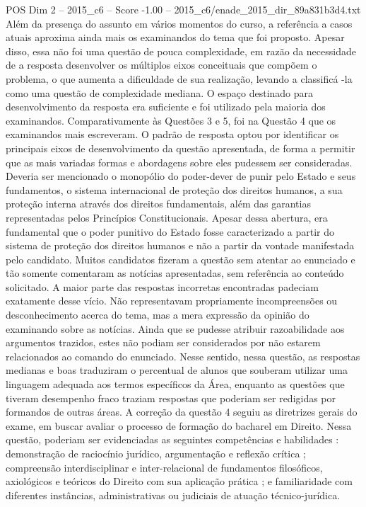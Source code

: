 \begin{textsample}{POS Dim 2 – 2015\_c6 – Score -1.00 – 2015\_c6/enade\_2015\_dir\_89a831b3d4.txt}
Além da presença do assunto em vários momentos do curso, a referência a casos atuais aproxima ainda mais os examinandos do tema que foi proposto.
Apesar disso, essa não foi uma questão de pouca complexidade, em razão da necessidade de a resposta desenvolver os múltiplos eixos conceituais que compõem o problema, o que aumenta a dificuldade de sua realização, levando a classificá -la como uma questão de complexidade mediana.
O espaço destinado para desenvolvimento da resposta era suficiente e foi utilizado pela maioria dos examinandos.
Comparativamente às Questões 3 e 5, foi na Questão 4 que os examinandos mais escreveram.
O padrão de resposta optou por identificar os principais eixos de desenvolvimento da questão apresentada, de forma a permitir que as mais variadas formas e abordagens sobre eles pudessem ser consideradas.
Deveria ser mencionado o monopólio do poder-dever de punir pelo Estado e seus fundamentos, o sistema internacional de proteção dos direitos humanos, a sua proteção interna através dos direitos fundamentais, além das garantias representadas pelos Princípios Constitucionais.
Apesar dessa abertura, era fundamental que o poder punitivo do Estado fosse caracterizado a partir do sistema de proteção dos direitos humanos e não a partir da vontade manifestada pelo candidato.
Muitos candidatos fizeram a questão sem atentar ao enunciado e tão somente comentaram as notícias apresentadas, sem referência ao conteúdo solicitado.
A maior parte das respostas incorretas encontradas padeciam exatamente desse vício.
Não representavam propriamente incompreensões ou desconhecimento acerca do tema, mas a mera expressão da opinião do examinando sobre as notícias.
Ainda que se pudesse atribuir razoabilidade aos argumentos trazidos, estes não podiam ser considerados por não estarem relacionados ao comando do enunciado.
Nesse sentido, nessa questão, as respostas medianas e boas traduziram o percentual de alunos que souberam utilizar uma linguagem adequada aos termos específicos da Área, enquanto as questões que tiveram desempenho fraco traziam respostas que poderiam ser redigidas por formandos de outras áreas.
A correção da questão 4 seguiu as diretrizes gerais do exame, em buscar avaliar o processo de formação do bacharel em Direito.
Nessa questão, poderiam ser evidenciadas as seguintes competências e habilidades : demonstração de raciocínio jurídico, argumentação e reflexão crítica ; compreensão interdisciplinar e inter-relacional de fundamentos filosóficos, axiológicos e teóricos do Direito com sua aplicação prática ; e familiaridade com diferentes instâncias, administrativas ou judiciais de atuação técnico-jurídica.

\end{textsample}
